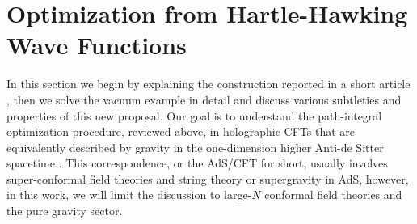 \documentclass[a4paper,12pt]{article}
\begin{document}
\section{Optimization from Hartle-Hawking Wave Functions}\label{Sec: 3 AdSP}
In this section we begin by explaining the construction reported in a short article \cite{Boruch:2020wax}, then we solve the vacuum example in detail and discuss various subtleties and properties of this new proposal. Our goal is to understand the path-integral optimization procedure, reviewed above, in holographic CFTs that are equivalently described by gravity in the one-dimension higher Anti-de Sitter spacetime \cite{Ma}. This correspondence, or the  AdS/CFT for short, usually involves super-conformal field theories and string theory or supergravity in AdS, however, in this work, we will limit the discussion to large-$N$ conformal field theories and the pure gravity sector.
\end{document}
